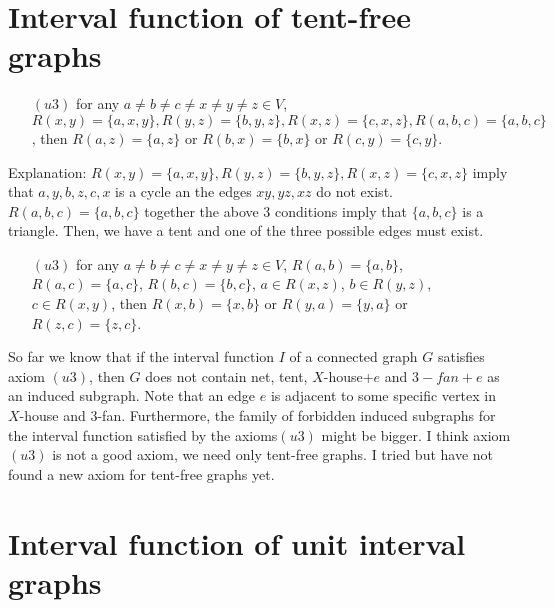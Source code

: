 \documentclass[10pt,a4paper]{article}
\begin{document}
\section{Interval function of tent-free graphs}

\begin{itemize}
\item[$(u3)$] for any $a\neq b\neq c\neq x \neq y\neq z\in V $, $R(x,y) = \{a,x,y\}, R(y,z) = \{b,y,z\}, R(x,z) = \{c,x,z\}, R(a,b,c) = \{a,b,c\}$, then $R(a,z)=\{a,z\}$ or $R(b,x)=\{b,x\}$ or $R(c,y)=\{c,y\}$.
\end{itemize}

Explanation: $R(x,y) = \{a,x,y\}, R(y,z) = \{b,y,z\}, R(x,z) = \{c,x,z\}$ imply that $a,y,b,z,c,x$ is a cycle an the edges $xy, yz, xz$ do not exist. $R(a,b,c) = \{a,b,c\}$ together the above 3 conditions imply that $\{a,b,c\}$ is a triangle. Then, we have a tent and one of the three possible edges must exist.

\begin{itemize}
\item[$(u3)$] for any $a\neq b\neq c\neq x \neq y\neq z\in V $, $R(a,b)=\{a,b\}$, $R(a,c)=\{a,c\}$, $R(b,c)=\{b,c\}$, $a\in R(x,z)$, $b\in R(y,z)$, $c\in R(x,y)$, then $R(x,b)=\{x,b\}$ or $R(y,a)=\{y,a\}$ or 
$R(z,c)=\{z,c\}$.
\end{itemize}
So far we know that if the interval function $I$ of a connected graph $G$ satisfies axiom $(u3)$, then $G$ does not contain net, tent, $X$-house+$e$ and $3-fan+e$ as an induced subgraph. Note that an edge $e$ is adjacent to some specific vertex in $X$-house and 3-fan. Furthermore, the family of forbidden induced subgraphs for the interval function satisfied by the axioms$(u3)$ might be bigger. I think axiom $(u3)$ is not a good axiom, we need only tent-free graphs. I tried but have not found a new axiom for tent-free graphs yet.


\section{Interval function of unit interval graphs}
\end{document}
